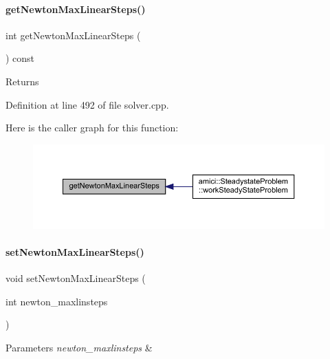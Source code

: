 \paragraph{\texorpdfstring{get\+Newton\+Max\+Linear\+Steps()}{getNewtonMaxLinearSteps()}}
{\footnotesize\ttfamily int get\+Newton\+Max\+Linear\+Steps (\begin{DoxyParamCaption}{ }\end{DoxyParamCaption}) const}

\begin{DoxyReturn}{Returns}

\end{DoxyReturn}


Definition at line 492 of file solver.\+cpp.

Here is the caller graph for this function\+:
\nopagebreak
\begin{figure}[H]
\begin{center}
\leavevmode
\includegraphics[width=350pt]{classamici_1_1_solver_a874c929a78d0e2af11c62ba958e1b3d1_icgraph}
\end{center}
\end{figure}
\mbox{\label{classamici_1_1_solver_af9143ab28630d5db394f641df0a8e477}} 
\paragraph{\texorpdfstring{set\+Newton\+Max\+Linear\+Steps()}{setNewtonMaxLinearSteps()}}
{\footnotesize\ttfamily void set\+Newton\+Max\+Linear\+Steps (\begin{DoxyParamCaption}\item[{int}]{newton\+\_\+maxlinsteps }\end{DoxyParamCaption})}


\begin{DoxyParams}{Parameters}
{\em newton\+\_\+maxlinsteps} & \\
\hline
\end{DoxyParams}


